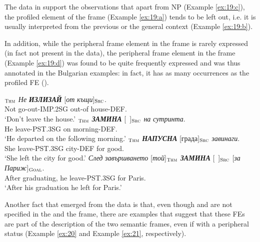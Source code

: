 \documentclass[output=paper,colorlinks,citecolor=brown]{langscibook}
\begin{document}
The data in  support the observations that apart from NP  (Example \ref{ex:19:c}), the profiled element of the  frame
 (Example \ref{ex:19:a}) tends to be left out, i.e. it is usually interpreted from the previous or the general context (Example \ref{ex:19:b}).

 In addition, while the peripheral frame element  in the  frame is rarely expressed (in fact not present in the data), the peripheral frame element  in the  frame (Example \ref{ex:19:d}) was found to be quite frequently expressed and was thus annotated in the Bulgarian examples: in fact, it has as  many occurrences as the profiled FE  ().

\begin{exe}
\ex  \label{ex:19}
\begin{xlist}
\ex  \label{ex:19:a}
\gll [\textit{\ }]$_{\text{\textsc{Thm}}}$ \textit{Не} \textit{\textbf{ИЗЛИЗАЙ}} [\textit{от} \textit{къщи}]$_{\text{\textsc{Src}}}$. \\
{} Not go-out-IMP.2SG out-of house-DEF.\\
\glt `Don't leave the house.'
\ex\label{ex:19:b}
$_{\text{\textsc{Thm}}}$ \textit{\textbf{ЗАМИНА}} [\ ]$_{\text{\textsc{Src}}}$ \textit{на} \textit{сутринта}. \\
He leave-PST.3SG {} on morning-DEF. \\
\glt `He departed on the following morning.'
\ex\label{ex:19:c}
\gll [\textit{Тя}]$_{\text{\textsc{Thm}}}$ \textit{\textbf{НАПУСНА}} [града]$_{\text{\textsc{Src}}}$ \textit{завинаги}. \\
She leave-PST.3SG city-DEF {for good}. \\
\glt `She left the city for good.'
\ex \label{ex:19:d}
\gll \textit{След} \textit{завършването} [\textit{той}]$_{\text{\textsc{Thm}}}$ \textit{\textbf{ЗАМИНА}} [\ ]$_{\text{\textsc{Src}}}$ [\textit{за} \textit{Париж}]$_{\text{\textsc{Goal}}}$. \\
 After graduating, he leave-PST.3SG {} for Paris. \\
\glt `After his graduation he left for Paris.'
\end{xlist}
\end{exe}

Another fact that emerged from the data is that, even though  and  are not specified in the  and the  frame, there are examples that suggest that these FEs are part of the description of the two semantic frames, even if with a peripheral status (Example \ref{ex:20} and Example \ref{ex:21}, respectively).
\end{document}
